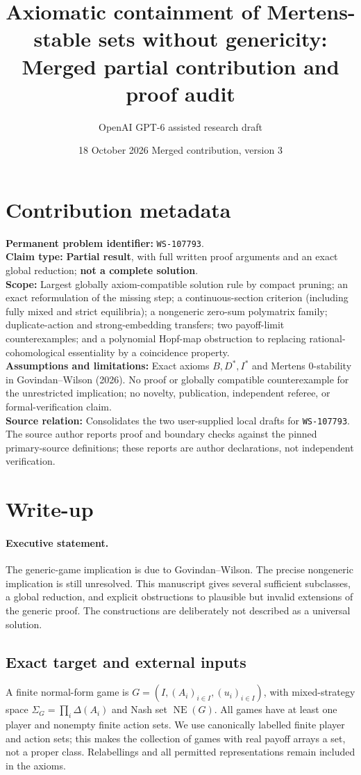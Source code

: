 \documentclass[11pt]{article}
\title{Axiomatic containment of Mertens-stable sets without genericity:\\
\large Merged partial contribution and proof audit}
\author{OpenAI GPT-6 assisted research draft}
\date{18 October 2026 \quad\textbullet\quad Merged contribution, version 3}
\theoremstyle{definition}
\newcommand{\NE}{\operatorname{NE}}
\begin{document}
\maketitle
\thispagestyle{plain}

\section*{Contribution metadata}
\noindent\textbf{Permanent problem identifier:} \texttt{WS-107793}.\\
\textbf{Claim type:} \textbf{Partial result}, with full written proof arguments
and an exact global reduction; \textbf{not a complete solution}.\\
\textbf{Scope:} Largest globally axiom-compatible solution rule by compact
pruning; an exact reformulation of the missing step; a continuous-section
criterion (including fully mixed and strict equilibria); a nongeneric
zero-sum polymatrix family; duplicate-action and strong-embedding transfers;
two payoff-limit counterexamples; and a polynomial Hopf-map obstruction to
replacing rational-cohomological essentiality by a coincidence property.\\
\textbf{Assumptions and limitations:} Exact axioms $B,D^*,I^*$ and
Mertens $0$-stability in Govindan--Wilson (2026). No proof or globally
compatible counterexample for the unrestricted implication; no novelty,
publication, independent referee, or formal-verification claim.\\
\textbf{Source relation:} Consolidates the two user-supplied local drafts
for \texttt{WS-107793}. The source author reports proof and boundary checks
against the pinned primary-source definitions; these reports are author
declarations, not independent verification.

\section{Write-up}
\paragraph{Executive statement.}
The generic-game implication is due to Govindan--Wilson. The precise
nongeneric implication is still unresolved. This manuscript gives several
sufficient subclasses, a global reduction, and explicit obstructions to
plausible but invalid extensions of the generic proof. The constructions
are deliberately not described as a universal solution.

\subsection{Exact target and external inputs}
A finite normal-form game is $G=(I,(A_i)_{i\in I},(u_i)_{i\in I})$,
with mixed-strategy space $\Sigma_G=\prod_i\Delta(A_i)$ and Nash set
$\NE(G)$. All games have at least one player and nonempty finite action sets.
We use canonically labelled finite player and action sets; this makes the
collection of games with real payoff arrays a set, not a proper class.
Relabellings and all permitted representations remain included in the axioms.
\end{document}
